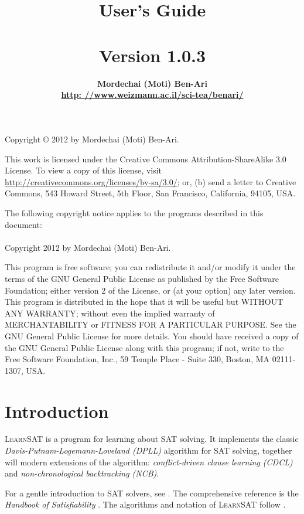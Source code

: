 \documentclass[11pt]{article}
\author{\bfseries Mordechai (Moti) Ben-Ari\\\url{http: //www.weizmann.ac.il/sci-tea/benari/}}
\title{\bfseries \ls\\\mbox{}\\
\bfseries\large User's Guide\\\mbox{}\\
\bfseries\normalsize Version 1.0.3}
\newcommand*{\ls}{\textsc{LearnSAT}}
\begin{document}
\maketitle
\thispagestyle{empty}

\vfill

\begin{center}
Copyright \copyright{} 2012 by Mordechai (Moti) Ben-Ari.
\end{center}
This work is licensed under the Creative Commons Attribution-ShareAlike 3.0
License. To view a copy of this license, visit
\url{http://creativecommons.org/licenses/by-sa/3.0/}; or, (b) send a letter
to Creative Commons, 543 Howard Street, 5th Floor, San Francisco,
California, 94105, USA.

\bigskip

 
\begin{center}
The following copyright notice applies to the programs described in this
document:\mbox{}\\\mbox{}\\
Copyright 2012 by Mordechai (Moti) Ben-Ari.
\end{center}

This program is free software; you can redistribute it and/or
modify it under the terms of the GNU General Public License
as published by the Free Software Foundation; either version 2
of the License, or (at your option) any later version.
This program is distributed in the hope that it will be useful
but WITHOUT ANY WARRANTY; without even the implied warranty of
MERCHANTABILITY or FITNESS FOR A PARTICULAR PURPOSE.
See the GNU General Public License for more details.
You should have received a copy of the GNU General Public License
along with this program; if not, write to the Free Software
Foundation, Inc., 59 Temple Place - Suite 330, Boston, MA
02111-1307, USA.

\newpage

\section{Introduction}

\ls{} is a program for learning about SAT solving. It implements the
classic \emph{Davis-Putnam-Logemann-Loveland (DPLL)} algorithm for SAT
solving, together will modern extensions of the algorithm:
\emph{conflict-driven clause learning (CDCL)} and
\emph{non-chronological backtracking (NCB)}.

For a gentle introduction to SAT solvers, see \cite[Chapter~6]{mlcs}.
The comprehensive reference is the \emph{Handbook of Satisfiability}
\cite{SAT}. The algorithms and notation of \ls{} follow \cite{mlm}.
\end{document}
